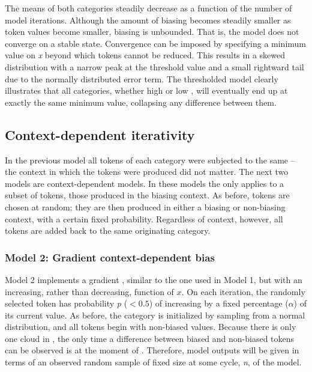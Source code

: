 The means of both categories steadily decrease as a function of the
number of model iterations. Although the amount of biasing becomes
steadily smaller as token values become smaller, biasing is unbounded.
That is, the model does not converge on a stable state. Convergence
can be imposed by specifying a minimum value on \emph{x} beyond which
tokens cannot be reduced. This results in a skewed distribution with
a narrow peak at the threshold value and a small rightward tail due
to the normally distributed error term. The thresholded model clearly
illustrates that all categories, whether high or low , will
eventually end up at exactly the same minimum value, collapsing any
difference between them. 

\subsection{\label{sec:Context-Dependent-Iterativity}Context-dependent iterativity}

In the previous model all tokens of each category were subjected to
the same   – the context in which the tokens were produced
did not matter. The next two models are context-dependent models.
In these models the   only applies to a subset of tokens,
those produced in the biasing context. As before,  tokens
are chosen at random; they are then produced in either a biasing or
non-biasing context, with a certain fixed probability. Regardless
of  context, however, all tokens are added back to the same
originating category.

\subsubsection{\label{subsec:Phrase-Final Lengthening}Model 2: Gradient context-dependent bias}

Model 2 implements a gradient  , similar to the one
used in Model 1, but with an increasing, rather than decreasing, function
of $x$. On each iteration, the randomly selected token has probability
\emph{p} ($< 0.5$) of increasing by a fixed percentage ($\alpha$) of
its current value. As before, the category is initialized by sampling
from a normal distribution, and all tokens begin with non-biased values.
Because there is only one cloud in , the only time a difference
between biased and non-biased tokens can be observed is at the moment
of . Therefore, model outputs will be given in terms of
an observed random sample of fixed size at some cycle, \emph{n}, of
the model.

